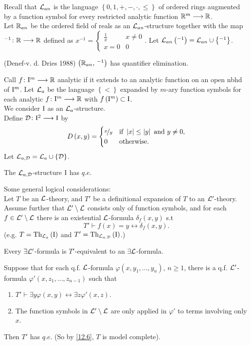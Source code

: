 Recall that $\mathcal{L}_{an}$ is the language $\left\{ 0,1,+,-,\cdot,\leq\right\} $
of ordered rings augmented by a function symbol for every restricted
analytic function $\mathbb{R}^{m}\longrightarrow\mathbb{R}$. \\
Let $\mathbb{R}_{an}$ be the ordered field of reals as an $\mathcal{L}_{an}$-structure
together with the map $^{-1}\colon\mathbb{R}\longrightarrow\mathbb{R}$ defined as $x^{-1}=\begin{cases}
\frac{1}{x} & x\neq0\\
x=0 & 0
\end{cases}$. Let $\mathcal{L}_{an}\left(^{-1}\right)=\mathcal{L}_{an}\cup\left\{ ^{-1}\right\} $.
\begin{thm*}
\label{12.1} (Denef-v. d. Dries 1988) $\left(\mathbb{R}_{an},\,^{-1}\right)$ has
quantifier elimination.
\end{thm*}
Call $f\colon\mathrm{I}^{m}\longrightarrow\mathbb{R}$ analytic if it extends to an analytic
function on an open nbhd of $\mathrm{I}^{m}$. Let $\mathcal{L}_{a}$ be the language
$\left\{ <\right\} $ expanded by $m$-ary function symbols for each
analytic $f\colon\mathrm{I}^{m}\longrightarrow\mathbb{R}$ with $f\left(\mathrm{I}^{m}\right)\subset\mathrm{I}$.\\
We consider $\mathrm{I}$ as an $\mathcal{L}_{a}$-structure.\\
Define $\mathcal{D}\colon\mathrm{I}^{2}\longrightarrow\mathrm{I}$ by
\[
D\left(x,y\right)=\begin{cases}
\nicefrac{x}{y} & \textrm{if }\left|x\right|\leq\left|y\right|\textrm{ and }y\neq0,\\
0 & \textrm{otherwise.}
\end{cases}
\]
Let $\mathcal{L}_{a,\mathcal{D}}=\mathcal{L}_{a}\cup\left\{ \mathcal{D}\right\} $.
\begin{thm*}
\label{12.2} The $\mathcal{L}_{a,\mathcal{D}}$-structure $\mathrm{I}$ has $q.e.$
\end{thm*}
Some general logical considerations:\\
Let $T$ be an $\mathcal{L}$-theory, and $T'$ be a definitional expansion
of $T$ to an $\mathcal{L}'$-theory. Assume further that $\mathcal{L}'\setminus\mathcal{L}$
consists only of function symbols, and for each $f\in\mathcal{L}'\setminus\mathcal{L}$
there is an existential $\mathcal{L}$-formula $\delta_{f}\left(x,y\right)$
s.t 
\[
T'\vdash f\left(x\right)=y\longleftrightarrow\delta_{f}\left(x,y\right).
\]
(e.g. $T=\mathrm{Th}_{\mathcal{L}_{a}}\left(\mathrm{I}\right)$ and $T'=\mathrm{Th}_{\mathcal{L}_{a,\mathcal{D}}}\left(\mathrm{I}\right)$.)
\begin{lem*}
\label{12.6} Every $\exists\mathcal{L}'$-formula is $T'$-equivalent to an $\exists\mathcal{L}$-formula.
\begin{lem*}
\label{12.7} Suppose that for each q.f. $\mathcal{L}$-formula $\varphi\left(x,y_{1},...,y_{n}\right)$,
$n\geq1$, there is a q.f. $\mathcal{L}'$-formula $\varphi'$$\left(x,z_{1},...,z_{n-1}\right)$
such that 
\begin{enumerate}
\item $T'\vdash\exists y\varphi\left(x,y\right)\longleftrightarrow\exists z\varphi'\left(x,z\right)$.
\item The function symbols in $\mathcal{L}'\setminus\mathcal{L}$ are only applied in $\varphi'$
to terms involving only $x$.
\end{enumerate}
\end{lem*}
Then $T'$ has $q.e$. (So by \eqref{12.6}, $T$ is model
complete).
\end{lem*}
